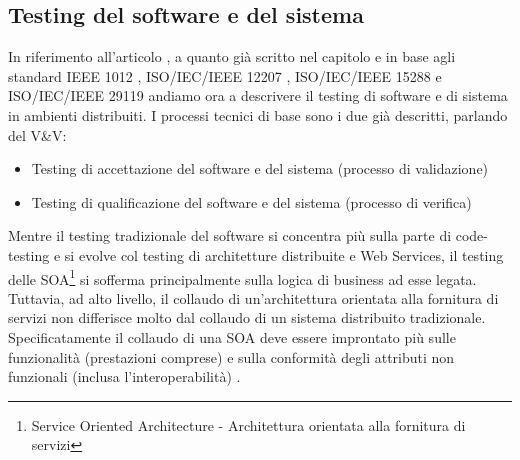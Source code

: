 \documentclass[../main.tex]{subfiles}
\begin{document}
\subsection{Testing del software e del sistema}
In riferimento all'articolo \cite{disttest}, a quanto già scritto nel capitolo e in base agli standard IEEE 1012 \cite{ieee1012}, ISO/IEC/IEEE 12207 \cite{iso12207}, ISO/IEC/IEEE 15288 \cite{iso15288} e ISO/IEC/IEEE 29119 \cite{iso29119} andiamo ora a descrivere il testing di software e di sistema in ambienti distribuiti.
I processi tecnici di base sono i due già descritti, parlando del V\&V:
\begin{itemize}
\item Testing di accettazione del software e del sistema (processo di validazione)
\item Testing di qualificazione del software e del sistema (processo di verifica)
\end{itemize}
Mentre il testing tradizionale del software si concentra più sulla parte di code-testing e si evolve col testing di architetture distribuite e Web Services, il testing delle SOA\footnote{Service Oriented Architecture - Architettura orientata alla fornitura di servizi} si sofferma principalmente sulla logica di business \cite{disttestSoaTest1} ad esse legata. Tuttavia, ad alto livello, il collaudo di un'architettura orientata alla fornitura di servizi non differisce molto dal collaudo di un sistema distribuito tradizionale.
Specificatamente il collaudo di una SOA deve essere improntato più sulle funzionalità (prestazioni comprese) e sulla conformità degli attributi non funzionali (inclusa l'interoperabilità) \cite{disttestSoaTest2}.
\end{document}
